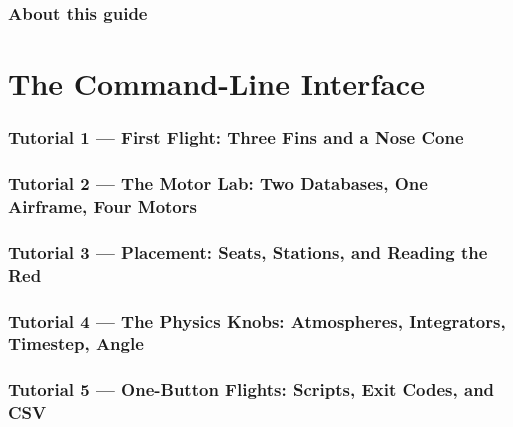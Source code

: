\documentclass[11pt,letterpaper]{article}
\begin{document}
\setcounter{page}{2}
\section*{About this guide}


\clearpage
\tableofcontents
\clearpage
{}
\setcounter{page}{1}

\part{The Command-Line Interface}\label{part:cli}




\clearpage
\section{Tutorial 1 --- First Flight: Three Fins and a Nose Cone}\label{sec:tut1}


\clearpage
\section{Tutorial 2 --- The Motor Lab: Two Databases, One Airframe, Four Motors}\label{sec:tut2}


\clearpage
\section{Tutorial 3 --- Placement: Seats, Stations, and Reading the Red}\label{sec:tut3}


\clearpage
\section{Tutorial 4 --- The Physics Knobs: Atmospheres, Integrators, Timestep, Angle}\label{sec:tut4}


\clearpage
\section{Tutorial 5 --- One-Button Flights: Scripts, Exit Codes, and CSV}\label{sec:tut5}

\end{document}
